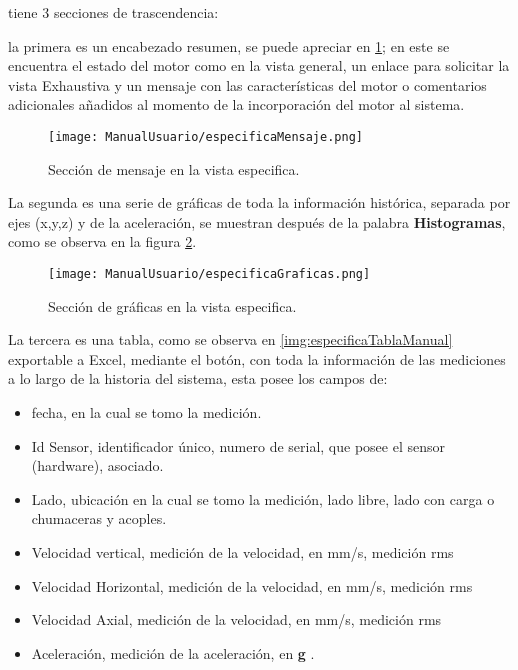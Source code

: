 tiene 3 secciones de trascendencia:

la primera es un encabezado resumen,
se puede apreciar en \ref{img:especificaHeaderManual}; en este se encuentra
el estado del motor como en la vista general, un enlace para solicitar la
vista Exhaustiva y un mensaje con las características del motor o
comentarios adicionales añadidos al momento de la incorporación del motor al
sistema.

    \begin{figure}[H]
		\centering
        \caption{Sección de mensaje en la vista especifica. }
        \texttt{[image: ManualUsuario/especificaMensaje.png]}
        \label{img:especificaHeaderManual}
	\end{figure}

La segunda es una serie de gráficas de toda la información histórica, separada
por ejes (x,y,z) y de la aceleración, se muestran después de la palabra
\textbf{Histogramas}, como se observa en la figura \ref{img:especificaGraficasManual}.

    \begin{figure}[H]
		\centering
        \caption{Sección de gráficas en la vista especifica. }
        \texttt{[image: ManualUsuario/especificaGraficas.png]}
        \label{img:especificaGraficasManual}
	\end{figure}

La tercera es una tabla, como se observa en \ref{img:especificaTablaManual}
exportable a Excel, mediante el botón, con toda la información de las mediciones
a lo largo de la historia del sistema, esta posee los campos de:
\begin{itemize}
    \item fecha, en la cual se tomo la medición.
    \item Id Sensor, identificador único, numero de serial, que posee el sensor
        (hardware), asociado.
    \item Lado, ubicación en la cual se tomo la medición, lado libre, lado con
        carga o chumaceras y acoples.
    \item Velocidad vertical, medición de la velocidad, en mm/s, medición rms
    \item Velocidad Horizontal, medición de la velocidad, en mm/s, medición rms
    \item Velocidad Axial, medición de la velocidad, en mm/s, medición rms
    \item Aceleración, medición de la aceleración, en \textbf{g} .
\end{itemize}

